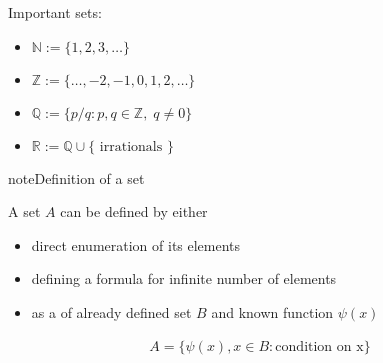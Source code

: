 \documentclass[letterpaper,10pt,english]{jupyterBook}
\begin{document}
\sphinxAtStartPar
Important sets:
\begin{itemize}
\item {} 
\sphinxAtStartPar
\(\mathbb{N} := \{1, 2, 3, \ldots \}\)

\item {} 
\sphinxAtStartPar
\(\mathbb{Z} := \{\ldots, -2, -1, 0, 1, 2, \ldots \}\)

\item {} 
\sphinxAtStartPar
\(\mathbb{Q} := \{ p/q : p, q \in \mathbb{Z}, \; q \ne 0 \}\)

\item {} 
\sphinxAtStartPar
\(\mathbb{R} := \mathbb{Q} \cup \{ \text{ irrationals } \}\)

\end{itemize}
\label{\detokenize{03.set_theory:ref-set-defition}}
\begin{sphinxadmonition}{note}{Definition of a set}

\sphinxAtStartPar
A set \(A\) can be defined by either
\begin{itemize}
\item {} 
\sphinxAtStartPar
direct enumeration of its elements

\item {} 
\sphinxAtStartPar
defining a formula for infinite number of elements

\item {} 
\sphinxAtStartPar
as a  of already defined set \(B\) and known function \(\psi(x)\)

\end{itemize}
\begin{equation*}
\begin{split}
A = \{ \psi(x), x \in B \colon \text{condition on x}\}
\end{split}
\end{equation*}\end{sphinxadmonition}
\end{document}
